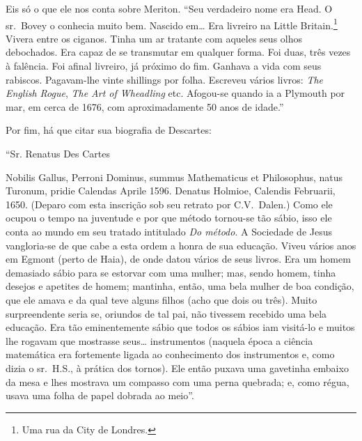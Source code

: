 Eis só o que ele nos conta sobre Meriton. “Seu verdadeiro nome
era Head. O sr.~Bovey o conhecia muito bem. Nascido em\ldots{} Era
livreiro na Little Britain.\footnote{ Uma rua da City de Londres.} 
Vivera entre os ciganos. Tinha um ar tratante com aqueles
seus olhos debochados. Era capaz de se transmutar em qualquer forma. Foi
duas, três vezes à falência. Foi afinal livreiro, já próximo do fim.
Ganhava a vida com seus rabiscos. Pagavam-lhe vinte shillings por
folha. Escreveu vários livros: \textit{The English Rogue}, \textit{The Art of
Wheadling} etc. Afogou-se quando ia a Plymouth por mar, em cerca
de 1676, com aproximadamente 50 anos de idade.”


Por fim, há que citar sua biografia de Descartes:

``Sr. Renatus Des Cartes

Nobilis Gallus, Perroni Dominus, summus Mathematicus et
Philosophus, natus Turonum, pridie Calendas Aprile 1596. Denatus Holmioe,
Calendis Februarii, 1650. (Deparo com esta inscrição sob seu
retrato por C.V.~Dalen.) Como ele ocupou o tempo na juventude e por que
método tornou-se tão sábio, isso ele conta ao mundo em seu tratado
intitulado \textit{Do método}. A Sociedade de Jesus vangloria-se de que
cabe a esta ordem a honra de sua educação. Viveu vários anos em Egmont
(perto de Haia), de onde datou vários de seus livros. Era um homem
demasiado sábio para se estorvar com uma mulher; mas, sendo homem, tinha
desejos e apetites de homem; mantinha, então, uma bela mulher de boa
condição, que ele amava e da qual teve alguns filhos (acho que dois ou
três). Muito surpreendente seria se, oriundos de tal pai, não tivessem
recebido uma bela educação. Era tão eminentemente sábio que todos os
sábios iam visitá-lo e muitos lhe rogavam que mostrasse seus\ldots{}
instrumentos (naquela época a ciência matemática era fortemente ligada ao
conhecimento dos instrumentos e, como dizia o sr.~H.S., à prática dos
tornos). Ele então puxava uma gavetinha embaixo da mesa e lhes mostrava um
compasso com uma perna quebrada; e, como régua, usava uma folha de papel
dobrada ao meio”.

